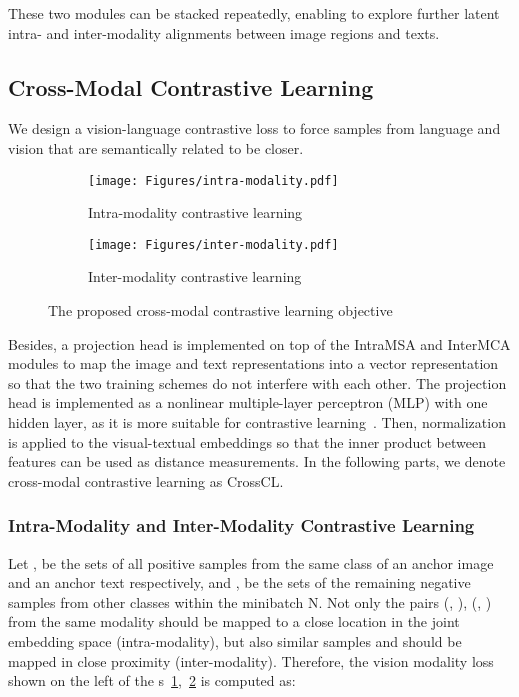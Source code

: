 \documentclass[preprint,review,12pt]{elsarticle}
\begin{document}
\normalsize
These two modules can be stacked repeatedly, enabling to explore further latent intra- and inter-modality alignments between image regions and texts.

\subsection{Cross-Modal Contrastive Learning}
We design a vision-language contrastive loss to force samples from language and vision that are semantically related to be closer. 
\begin{figure*}[t!]
\centering
\begin{subfigure}{\textwidth}
  {
  \texttt{[image: Figures/intra-modality.pdf]}}\quad
  \caption{Intra-modality contrastive learning}
  \label{fig:intra_modal_loss}
\end{subfigure}
\hfill
\begin{subfigure}{\textwidth}
  {
  \texttt{[image: Figures/inter-modality.pdf]}}\quad
  \caption{Inter-modality contrastive learning}
  \label{fig:inter_modal_loss}
\end{subfigure}
\caption{The proposed cross-modal contrastive learning objective}
\label{fig:contrastive_loss}
\end{figure*}
Besides, a projection head is implemented on top of the IntraMSA and InterMCA modules to map the image and text representations into a vector representation so that the two training schemes do not interfere with each other. 
The projection head is implemented as a nonlinear multiple-layer perceptron (MLP) with one hidden layer, as it is more suitable for contrastive learning~\cite{chen2020simple}. 
Then,  normalization is applied to the visual-textual embeddings so that the inner product between features can be used as distance measurements. In the following parts, we denote cross-modal contrastive learning as CrossCL. 

\subsubsection{Intra-Modality and Inter-Modality Contrastive Learning}
Let ,  be the sets of all positive samples from the same class of an anchor image  and an anchor text  respectively, and ,  be the sets of the remaining negative samples from other classes within the minibatch N. Not only the pairs (, ), (, ) from the same modality should be mapped to a close location in the joint embedding space (intra-modality), but also similar samples  and  should be mapped in close proximity (inter-modality). Therefore, the vision modality loss shown on the left of the \figurename s~\ref{fig:intra_modal_loss},~\ref{fig:inter_modal_loss} is computed as: 
\small
\end{document}

